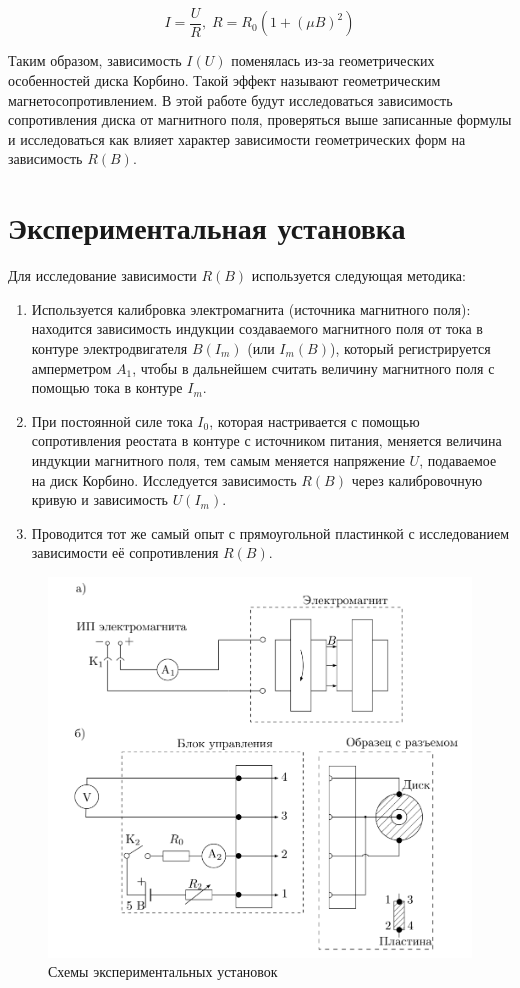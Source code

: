 \begin{equation}
    I = \frac{U}{R}, \; R = R_0 (1 + (\mu B)^2)
\end{equation}

Таким образом, зависимость $I(U)$ поменялась из-за геометрических особенностей диска Корбино. Такой эффект называют геометрическим магнетосопротивлением. В этой работе будут исследоваться зависимость сопротивления диска от магнитного поля, проверяться выше записанные формулы и исследоваться как влияет характер зависимости геометрических форм на зависимость $R(B)$.

\section{Экспериментальная установка}

Для исследование зависимости $R(B)$ используется следующая методика:

\begin{enumerate}
    \item Используется калибровка электромагнита (источника магнитного поля): находится зависимость индукции создаваемого магнитного поля от тока в контуре электродвигателя $B(I_m)$ (или $I_m(B)$), который регистрируется амперметром $A_1$, чтобы в дальнейшем считать величину магнитного поля с помощью тока в контуре $I_m$.
    \item При постоянной силе тока $I_0$, которая настривается с помощью сопротивления реостата в контуре с источником питания, меняется величина индукции магнитного поля, тем самым меняется напряжение $U$, подаваемое на диск Корбино. Исследуется зависимость $R(B)$ через калибровочную кривую и зависимость $U(I_m)$.
    \item Проводится тот же самый опыт с прямоугольной пластинкой с исследованием зависимости её сопротивления $R(B)$.
\end{enumerate}

\begin{figure}[h!]
    \centering
    \includegraphics[width = 13 cm]{images/2.png}
    \caption{Схемы экспериментальных установок}
    \label{scheme}
\end{figure}

